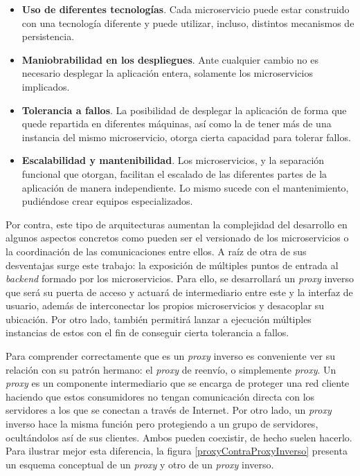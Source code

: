 \documentclass[11pt,spanish,listoffigures]{tfgetsinf}
\begin{document}
\begin{itemize}

	\item \textbf{Uso de diferentes tecnologías}. Cada microservicio puede estar construido con una tecnología diferente y puede utilizar, incluso, distintos mecanismos de persistencia.

	\item \textbf{Maniobrabilidad en los despliegues}. Ante cualquier cambio no es necesario desplegar la aplicación entera, solamente los microservicios implicados.

	\item \textbf{Tolerancia a fallos}. La posibilidad de desplegar la aplicación de forma que quede repartida en diferentes máquinas, así como la de tener más de una instancia del mismo microservicio, otorga cierta capacidad para tolerar fallos.

	\item \textbf{Escalabilidad y mantenibilidad}. Los microservicios, y la separación funcional que otorgan, facilitan el escalado de las diferentes partes de la aplicación de manera independiente. Lo mismo sucede con el mantenimiento, pudiéndose crear equipos especializados.

\end{itemize}

Por contra, este tipo de arquitecturas aumentan la complejidad del desarrollo en algunos aspectos concretos como pueden ser el versionado de los microservicios o la coordinación de las comunicaciones entre ellos. A raíz de otra de sus desventajas surge este trabajo: la exposición de múltiples puntos de entrada al \emph{backend} formado por los microservicios. Para ello, se desarrollará un \emph{proxy} inverso que será su puerta de acceso y actuará de intermediario entre este y la interfaz de usuario, además de interconectar los propios microservicios y desacoplar su ubicación. Por otro lado, también permitirá lanzar a ejecución múltiples instancias de estos con el fin de conseguir cierta tolerancia a fallos.

Para comprender correctamente que es un \emph{proxy} inverso es conveniente ver su relación con su patrón hermano: el \emph{proxy} de reenvío, o simplemente \emph{proxy}. Un \emph{proxy} es un componente intermediario que se encarga de proteger una red cliente haciendo que estos consumidores no tengan comunicación directa con los servidores a los que se conectan a través de Internet. Por otro lado, un \emph{proxy} inverso hace la misma función pero protegiendo a un grupo de servidores, ocultándolos así de sus clientes. Ambos pueden coexistir, de hecho suelen hacerlo. Para ilustrar mejor esta diferencia, la figura \ref{proxyContraProxyInverso} presenta un esquema conceptual de un \emph{proxy} y otro de un \emph{proxy} inverso.
\end{document}
